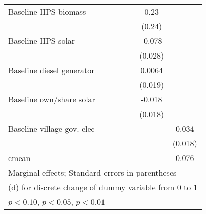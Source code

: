 \begin{table}[htbp]
\begin{tabular*}{1\hsize}{@{\hskip\tabcolsep\extracolsep\fill}l*{6}{c}}
Baseline HPS biomass&                  &                  &                  &                  &     0.23         &                  \\
                &                  &                  &                  &                  &   (0.24)         &                  \\
Baseline HPS solar&                  &                  &                  &                  &   -0.078\sym{***}&                  \\
                &                  &                  &                  &                  &  (0.028)         &                  \\
Baseline diesel generator&                  &                  &                  &                  &   0.0064         &                  \\
                &                  &                  &                  &                  &  (0.019)         &                  \\
Baseline own/share solar&                  &                  &                  &                  &   -0.018         &                  \\
                &                  &                  &                  &                  &  (0.018)         &                  \\
Baseline village gov. elec&                  &                  &                  &                  &                  &    0.034\sym{*}  \\
                &                  &                  &                  &                  &                  &  (0.018)         \\
\midrule
cmean           &                  &                  &                  &                  &                  &    0.076         \\
\bottomrule
\multicolumn{7}{l}{\footnotesize Marginal effects; Standard errors in parentheses}\\
\multicolumn{7}{l}{\footnotesize  (d) for discrete change of dummy variable from 0 to 1}\\
\multicolumn{7}{l}{\footnotesize \sym{*} \(p<0.10\), \sym{**} \(p<0.05\), \sym{***} \(p<0.01\)}\\
\end{tabular*}
\end{table}

